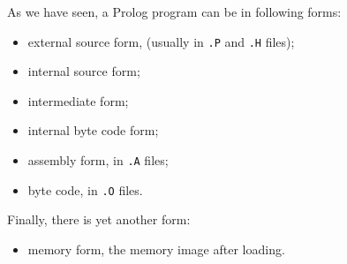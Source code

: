 As we have seen, a Prolog program can be in following forms:
\begin{itemize}
\item	external source form, (usually in {\tt *.P} and {\tt *.H} files);
\item	internal source form;
\item	intermediate form;
\item	internal byte code form;
\item	assembly form, in {\tt *.A} files;
\item	byte code, in {\tt *.O} files.
\end{itemize}
Finally, there is yet another form:
\begin{itemize}
\item	memory form, the memory image after loading.
\end{itemize}


